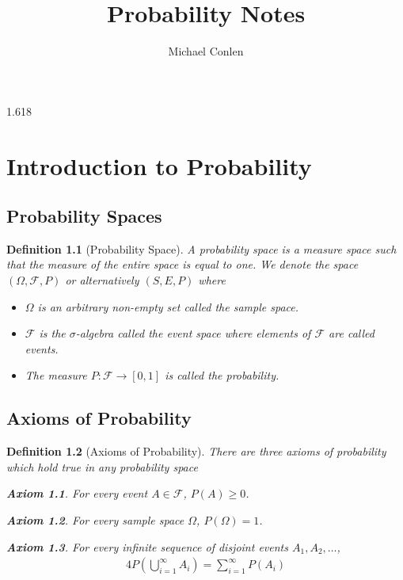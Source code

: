 \documentclass[11pt, oneside]{book}   	%
\title{Probability Notes}
\author{Michael Conlen}
\newtheorem{definition}{Definition}[chapter]
\newtheorem{axiom}{Axiom}[chapter]
\begin{document}
\frontmatter
\maketitle
\tableofcontents
\setcounter{tocdepth}{4}

\mainmatter
\begin{spacing}{1.618}
\chapter{Introduction to Probability}
	\section{Probability Spaces}
		\begin{definition}[Probability Space]
			A probability space is a measure space such that the measure of the entire space is equal to one. We denote the space $(\Omega, \mathcal{F}, P)$ or alternatively $(S, E, P)$ where
			\begin{itemize}
				\item $\Omega$ is an arbitrary non-empty set called the \emph{sample space}. 
				\item $\mathcal{F}$ is the $\sigma$-algebra called the \emph{event space} where elements of $\mathcal{F}$ are called \emph{events}. 
				\item The measure $P:\mathcal{F} \to [0, 1]$ is called the \emph{probability}. 
			\end{itemize}
		\end{definition}

	\section{Axioms of Probability}	
		\begin{definition}[Axioms of Probability]
			There are three axioms of probability which hold true in any probability space
			\begin{axiom}
				For every event $A\in \mathcal{F}$, $P(A) \geq 0$. 		
			\end{axiom} 
			\begin{axiom}
				For every sample space $\Omega$, $P(\Omega)=1$. 
			\end{axiom}
			\begin{axiom}
				For every infinite sequence of disjoint events $A_1, A_2, \dots$, 
				\begin{alignat}{4}
					P\left(\bigcup_{i=1}^\infty A_i\right)=\sum_{i=1}^\infty P(A_i)
				\end{alignat}
			\end{axiom}
		\end{definition}


\end{spacing}
\end{document}
